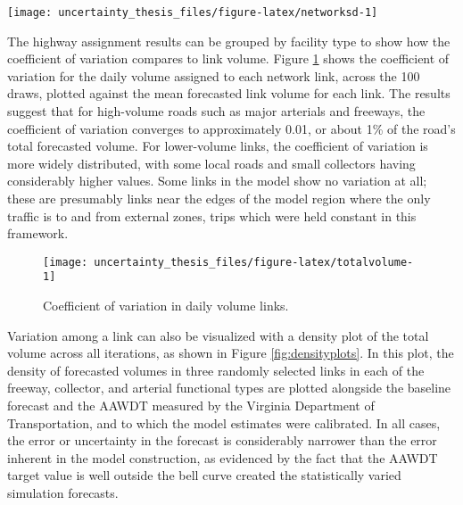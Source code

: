 \documentclass[fancy, masters,twoside]{byuthesis}
\begin{document}
\begin{sidewaysfigure}

{\centering \texttt{[image: uncertainty\_thesis\_files/figure-latex/networksd-1]} 

}

\caption{Standard deviation in daily forecasted volume.}\label{fig:networksd}
\end{sidewaysfigure}

The highway assignment results can be grouped by facility type to show how the coefficient of variation compares to link volume. Figure \ref{fig:totalvolume} shows the coefficient of variation for the daily volume assigned to each network link, across the 100 draws, plotted against the mean forecasted link volume for each link. The results suggest that for high-volume roads such as major arterials and freeways, the coefficient of variation converges to approximately 0.01, or about 1\% of the road's total forecasted volume. For lower-volume links, the coefficient of variation is more widely distributed, with some local roads and small collectors having considerably higher values. Some links in the model show no variation at all; these are presumably links near the edges of the model region where the only traffic is to and from external zones, trips which were held constant in this framework.

\begin{figure}

{\centering \texttt{[image: uncertainty\_thesis\_files/figure-latex/totalvolume-1]} 

}

\caption{Coefficient of variation in daily volume links.}\label{fig:totalvolume}
\end{figure}

Variation among a link can also be visualized with a density plot of the total volume across all iterations, as shown in Figure \ref{fig:densityplots}. In this plot, the density of forecasted volumes in three randomly selected links in each of the freeway, collector, and arterial functional types are plotted alongside the baseline forecast and the AAWDT measured by the Virginia Department of Transportation, and to which the model estimates were calibrated. In all cases, the error or uncertainty in the forecast is considerably narrower than the error inherent in the model construction, as evidenced by the fact that the AAWDT target value is well outside the bell curve created the statistically varied simulation forecasts.
\end{document}
